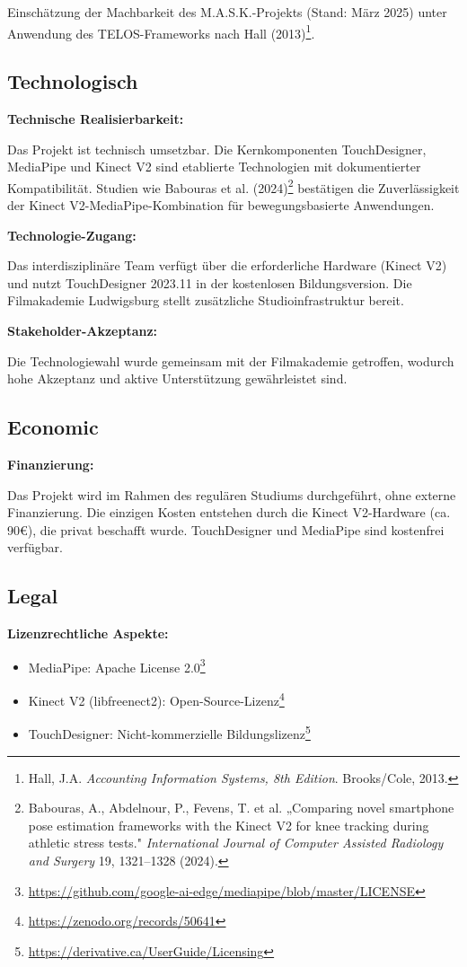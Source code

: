 Einschätzung der Machbarkeit des M.A.S.K.-Projekts (Stand: März 2025) unter Anwendung des TELOS-Frameworks nach Hall (2013)\footnote{Hall, J.A. \textit{Accounting Information Systems, 8th Edition}. Brooks/Cole, 2013.}.

\subsection{Technologisch}

\textbf{Technische Realisierbarkeit:}
\raggedright Das Projekt ist technisch umsetzbar. Die Kernkomponenten TouchDesigner, MediaPipe und Kinect V2 sind etablierte Technologien mit dokumentierter Kompatibilität. Studien wie Babouras et al. (2024)\footnote{Babouras, A., Abdelnour, P., Fevens, T. et al. „Comparing novel smartphone pose estimation frameworks with the Kinect V2 for knee tracking during athletic stress tests." \textit{International Journal of Computer Assisted Radiology and Surgery} 19, 1321–1328 (2024).} bestätigen die Zuverlässigkeit der Kinect V2-MediaPipe-Kombination für bewegungsbasierte Anwendungen.

\textbf{Technologie-Zugang:}
\raggedright Das interdisziplinäre Team verfügt über die erforderliche Hardware (Kinect V2) und nutzt TouchDesigner 2023.11 in der kostenlosen Bildungsversion. Die Filmakademie Ludwigsburg stellt zusätzliche Studioinfrastruktur bereit.

\textbf{Stakeholder-Akzeptanz:}
\raggedright Die Technologiewahl wurde gemeinsam mit der Filmakademie getroffen, wodurch hohe Akzeptanz und aktive Unterstützung gewährleistet sind.

\subsection{Economic}

\textbf{Finanzierung:}
\raggedright Das Projekt wird im Rahmen des regulären Studiums durchgeführt, ohne externe Finanzierung. Die einzigen Kosten entstehen durch die Kinect V2-Hardware (ca. 90€), die privat beschafft wurde. TouchDesigner und MediaPipe sind kostenfrei verfügbar.

\subsection{Legal}

\textbf{Lizenzrechtliche Aspekte:}
\begin{itemize}
    \item MediaPipe: Apache License 2.0\footnote{\url{https://github.com/google-ai-edge/mediapipe/blob/master/LICENSE}}
    \item Kinect V2 (libfreenect2): Open-Source-Lizenz\footnote{\url{https://zenodo.org/records/50641}}
    \item TouchDesigner: Nicht-kommerzielle Bildungslizenz\footnote{\url{https://derivative.ca/UserGuide/Licensing}}
\end{itemize}

